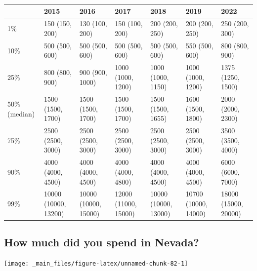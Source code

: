 \documentclass[
]{book}
\begin{document}
\begin{table}
\centering
\begin{tabular}[t]{>{}l|>{}l|>{}l|>{}l|>{}l|>{}l|>{}l}
\hline
  & 2015 & 2016 & 2017 & 2018 & 2019 & 2022\\
\hline
1\% & 150 (150, 200) & 130 (100, 200) & 150 (100, 200) & 200 (200, 250) & 200 (200, 250) & 250 (200, 300)\\
\hline
10\% & 500 (500, 600) & 500 (500, 600) & 500 (500, 600) & 500 (500, 600) & 550 (500, 600) & 800 (800, 900)\\
\hline
25\% & 800 (800, 900) & 900 (900, 1000) & 1000 (1000, 1200) & 1000 (1000, 1150) & 1000 (1000, 1200) & 1375 (1250, 1500)\\
\hline
50\% (median) & 1500 (1500, 1700) & 1500 (1500, 1700) & 1500 (1500, 1700) & 1500 (1500, 1655) & 1600 (1500, 1800) & 2000 (2000, 2300)\\
\hline
75\% & 2500 (2500, 3000) & 2500 (2500, 3000) & 2500 (2500, 3000) & 2500 (2500, 3000) & 2500 (2500, 3000) & 3500 (3500, 4000)\\
\hline
90\% & 4000 (4000, 4500) & 4000 (4000, 4500) & 4000 (4000, 4800) & 4000 (4000, 4500) & 4000 (4000, 4500) & 6000 (6000, 7000)\\
\hline
99\% & 10000 (10000, 13200) & 10000 (10000, 15000) & 12000 (11000, 15000) & 10000 (10000, 13000) & 10700 (10000, 14000) & 18000 (15000, 20000)\\
\hline
\end{tabular}
\end{table}

\hypertarget{how-much-did-you-spend-in-nevada}{%
\subsection{How much did you spend in Nevada?}\label{how-much-did-you-spend-in-nevada}}

\texttt{[image: \_main\_files/figure-latex/unnamed-chunk-82-1]}
\end{document}
